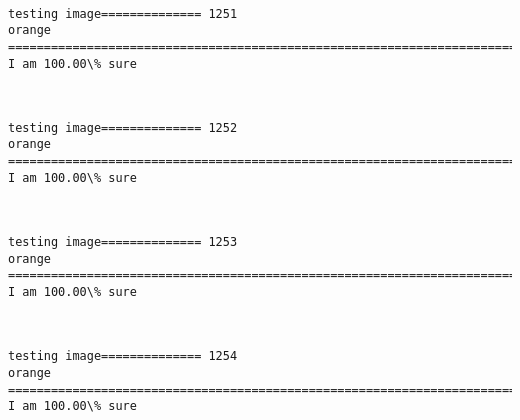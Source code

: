 \documentclass[11pt]{article}
\begin{document}
    \begin{center}
    \end{center}
    { \hspace*{\fill} \\}
    
    \begin{Verbatim}[commandchars=\\\{\}]
testing image============== 1251
orange
============================================================================
I am 100.00\% sure

    \end{Verbatim}

    \begin{center}
    \end{center}
    { \hspace*{\fill} \\}
    
    \begin{Verbatim}[commandchars=\\\{\}]
testing image============== 1252
orange
============================================================================
I am 100.00\% sure

    \end{Verbatim}

    \begin{center}
    \end{center}
    { \hspace*{\fill} \\}
    
    \begin{Verbatim}[commandchars=\\\{\}]
testing image============== 1253
orange
============================================================================
I am 100.00\% sure

    \end{Verbatim}

    \begin{center}
    \end{center}
    { \hspace*{\fill} \\}
    
    \begin{Verbatim}[commandchars=\\\{\}]
testing image============== 1254
orange
============================================================================
I am 100.00\% sure

    \end{Verbatim}
\end{document}
